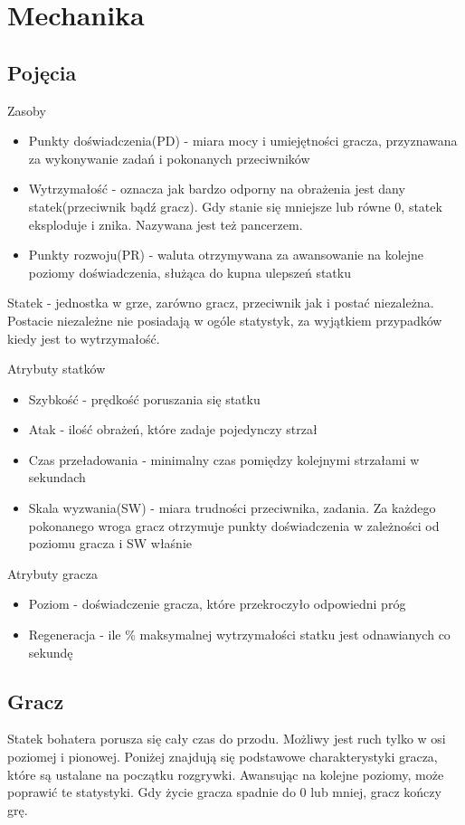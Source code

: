 \chapter{Mechanika}

\section{Pojęcia}

Zasoby
\begin{itemize}
\item{ Punkty doświadczenia(PD) - miara mocy i umiejętności gracza, przyznawana za wykonywanie zadań i pokonanych przeciwników}
\item{Wytrzymałość - oznacza jak bardzo odporny na obrażenia jest dany statek(przeciwnik bądź gracz). Gdy stanie się mniejsze lub równe 0, statek eksploduje i znika. Nazywana jest też pancerzem.}
\item{Punkty rozwoju(PR) - waluta otrzymywana za awansowanie na kolejne poziomy doświadczenia, służąca do kupna ulepszeń statku}
\end{itemize}

Statek - jednostka w grze, zarówno gracz, przeciwnik jak i postać niezależna. Postacie niezależne nie posiadają w ogóle statystyk, za wyjątkiem przypadków kiedy jest to wytrzymałość.

Atrybuty statków
\begin{itemize}
\item{ Szybkość - prędkość poruszania się statku }
\item{Atak - ilość obrażeń, które zadaje pojedynczy strzał}
\item{Czas przeładowania - minimalny czas pomiędzy kolejnymi strzałami w sekundach}
\item{Skala wyzwania(SW) - miara trudności przeciwnika, zadania. Za każdego pokonanego wroga gracz otrzymuje punkty doświadczenia w zależności od poziomu gracza i SW właśnie}
\end{itemize}

Atrybuty gracza
\begin{itemize}
\item{ Poziom - doświadczenie gracza, które przekroczyło odpowiedni próg }
\item{Regeneracja - ile \% maksymalnej wytrzymałości statku jest odnawianych co sekundę}
\end{itemize}


\section{Gracz}
Statek bohatera porusza się cały czas do przodu. Możliwy jest ruch tylko w osi poziomej i pionowej.
Poniżej znajdują się podstawowe charakterystyki gracza, które są ustalane na początku rozgrywki. Awansując na kolejne poziomy, może poprawić te statystyki. Gdy życie gracza spadnie do 0 lub mniej, gracz kończy grę.

